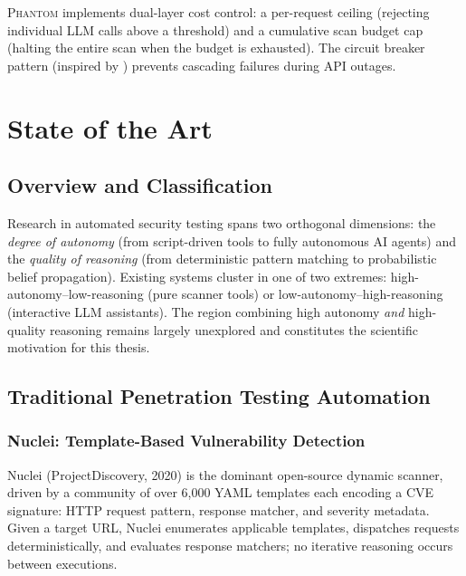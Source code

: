 \documentclass[12pt,a4paper,oneside,openany]{book}
\newcommand{\Phantom}{\textsc{Phantom}}
\begin{document}
\Phantom{} implements dual-layer cost control: a per-request ceiling (rejecting individual LLM calls above a threshold) and a cumulative scan budget cap (halting the entire scan when the budget is exhausted). The circuit breaker pattern (inspired by \cite{nygard2007release}) prevents cascading failures during API outages.


\chapter{State of the Art}

\section{Overview and Classification}

Research in automated security testing spans two orthogonal dimensions: the \textit{degree of autonomy} (from script-driven tools to fully autonomous AI agents) and the \textit{quality of reasoning} (from deterministic pattern matching to probabilistic belief propagation). Existing systems cluster in one of two extremes: high-autonomy--low-reasoning (pure scanner tools) or low-autonomy--high-reasoning (interactive LLM assistants). The region combining high autonomy \textit{and} high-quality reasoning remains largely unexplored and constitutes the scientific motivation for this thesis.

\section{Traditional Penetration Testing Automation}

\subsection{Nuclei: Template-Based Vulnerability Detection}

Nuclei (ProjectDiscovery, 2020) is the dominant open-source dynamic scanner, driven by a community of over 6,000 YAML templates each encoding a CVE signature: HTTP request pattern, response matcher, and severity metadata. Given a target URL, Nuclei enumerates applicable templates, dispatches requests deterministically, and evaluates response matchers; no iterative reasoning occurs between executions.
\end{document}
